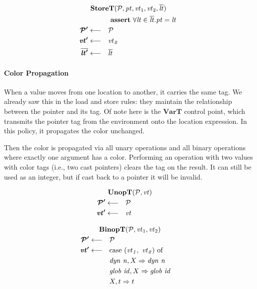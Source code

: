 \documentclass[acmsmall,review,anonymous]{acmart}\settopmatter{printfolios=true,printccs=false,printacmref=false}
\begin{document}
\[\begin{aligned}
\truledef{\storet}
\assert{\forall \lt \in \overline{\lt} . \pt = \lt}
\settag{\PCT'}{\PCT}
\settag{\vt'}{\vt_2}
\settag{\overline{\lt'}}{\overline{\lt}}
\end{aligned}\]

\paragraph*{Color Propagation}

When a value moves from one location to another, it carries the same tag.
We already saw this in the load and store rules: they maintain the relationship
between the pointer and its tag. Of note here is the \(\mathbf{VarT}\) control point,
which transmits the pointer tag from the environment onto the location expression.
In this policy, it propagates the color unchanged.

\varstep


Then the color is propagated via all unary operations and all binary operations
where exactly one argument has a color. Performing an operation with two values
with color tags (i.e., two cast pointers) clears the tag on the result. It can still
be used as an integer, but if cast back to a pointer it will be invalid.

\unopstep

\binopstep

\vspace{\abovedisplayskip}
            
\begin{minipage}[t]{.49\textwidth}            
  \[\begin{aligned}
  \truledef{\unopt}
  \settag{\PCT'}{\PCT}
  \settag{\vt'}{\vt}
  \end{aligned}\]
\end{minipage}
\begin{minipage}[t]{.49\textwidth}           
  \[\begin{aligned}
  \truledef{\binopt}
  \settag{\PCT'}{\PCT}
  \settag{\vt'}{\caseof{(\vt_1,~ \vt_2)}}
  \caseentry{\mathit{dyn ~ n},X}{\mathit{dyn ~ n}} \\
  \caseentry{\mathit{glob ~ id},X}{\mathit{glob ~ id}} \\
  \caseentry{X,t}{t} \\
  \end{aligned}\]
\end{minipage}
\end{document}
